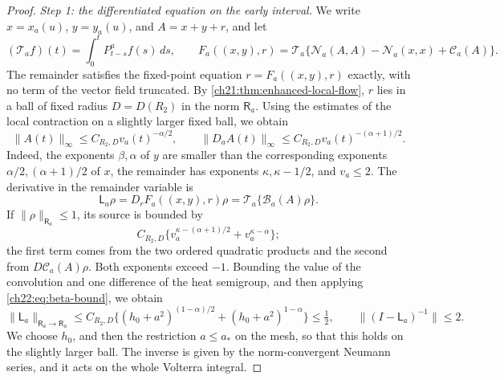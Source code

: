 \begin{proof}
\emph{Step 1: the differentiated equation on the early interval.} We write $x=x_a(u)$, $y=y_a(u)$, and $A=x+y+r$, and let
\[
 (\mathcal T_af)(t)=\int_0^tP_{t-s}^af(s)\,ds,
 \qquad
 F_a((x,y),r)=\mathcal T_a\bigl\{\mathcal N_a(A,A)-\mathcal N_a(x,x)+\mathscr C_a(A)\bigr\}.
\]
The remainder satisfies the fixed-point equation $r=F_a((x,y),r)$ exactly, with no term of the vector field truncated. By \cref{ch21:thm:enhanced-local-flow}, $r$ lies in a ball of fixed radius $D=D(R_2)$ in the norm $\mathsf R_a$. Using the estimates of the local contraction on a slightly larger fixed ball, we obtain
\begin{equation}\label{ch22:eq:early-A-profiles}
 \|A(t)\|_\infty\le C_{R_2,D}v_a(t)^{-\alpha/2},\qquad
 \|D_aA(t)\|_\infty\le C_{R_2,D}v_a(t)^{-(\alpha+1)/2}.
\end{equation}
Indeed, the exponents $\beta,\alpha$ of $y$ are smaller than the corresponding exponents $\alpha/2,(\alpha+1)/2$ of $x$, the remainder has exponents $\kappa,\kappa-1/2$, and $v_a\le2$. The derivative in the remainder variable is
\[
 \mathsf L_a\rho=D_rF_a((x,y),r)\rho=\mathcal T_a\{\mathscr B_a(A)\rho\}.
\]
If $\|\rho\|_{\mathsf R_a}\le1$, its source is bounded by
\[
 C_{R_2,D}\bigl\{v_a^{\kappa-(\alpha+1)/2}+v_a^{\kappa-\alpha}\bigr\};
\]
the first term comes from the two ordered quadratic products and the second from $D\mathscr C_a(A)\rho$. Both exponents exceed $-1$. Bounding the value of the convolution and one difference of the heat semigroup, and then applying \eqref{ch22:eq:beta-bound}, we obtain
\begin{equation}\label{ch22:eq:variation-inverse}
 \|\mathsf L_a\|_{\mathsf R_a\to\mathsf R_a}\le C_{R_2,D}\bigl\{(h_0+a^2)^{(1-\alpha)/2}+(h_0+a^2)^{1-\alpha}\bigr\}\le\tfrac12,
 \qquad
 \|(I-\mathsf L_a)^{-1}\|\le2 .
\end{equation}
We choose $h_0$, and then the restriction $a\le a_*$ on the mesh, so that this holds on the slightly larger ball. The inverse is given by the norm-convergent Neumann series, and it acts on the whole Volterra integral.


\end{proof}
